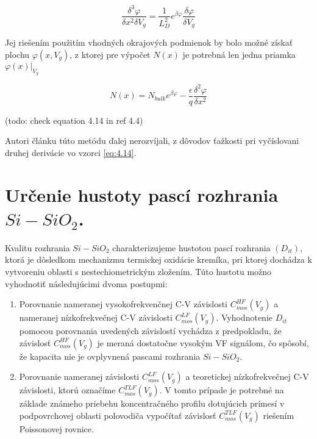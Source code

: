 \begin{equation}\label{eq:4.13}
\frac{\delta^{3}\varphi}{\delta x^{2} \delta V_{g}} = \frac{1}{L_{D}^{2}} e^{\beta\varphi} \frac{\delta\varphi}{\delta V_{g}}
\end{equation}

Jej riešením použitím vhodných okrajových podmienok by bolo možné
získať plochu $\varphi(x,V_{g})$, z ktorej pre výpočet $N(x)$ je
potrebná len jedna priamka $\varphi(x)\rvert_{V_{g}}$

\begin{equation}\label{eq:4.14}
N(x) = N_{bulk}e^{\beta\varphi} - \frac{\epsilon}{q} \frac{\delta^{2}\varphi}{\delta x^{2}}
\end{equation}

(todo: check equation 4.14 in ref 4.4)

Autori článku \cite{4.4} túto metódu ďalej nerozvíjali, z dôvodov
ťažkosti pri vyčíslovani druhej derivácie vo vzorci \ref{eq:4.14}.


\section{Určenie hustoty pascí rozhrania $Si-SiO_{2}$.}\label{sec:4.2}

Kvalitu rozhrania $Si-SiO_{2}$ charakterizujeme hustotou pascí
rozhrania $(D_{it})$, ktorá je dôsledkom mechanizmu termickej oxidácie
kremíka, pri ktorej dochádza k vytvoreniu oblasti s nestechiometrickým
zložením. Túto hustotu možno vyhodnotiť následujúcimi dvoma postupmi:

\begin{enumerate}
\item Porovnanie nameranej vysokofrekvenčnej C-V závislosti
  $C_{mos}^{HF}(V_{g})$ a nameranej nízkofrekvečnej C-V závislosti
  $C_{mos}^{LF}(V_{g})$. Vyhodnotenie $D_{it}$ pomocou porovnania
  uvedených závislostí vychádza z predpokladu, že závislosť
  $C_{mos}^{HF}(V_{g})$ je meraná dostatočne vysokým VF signálom, čo
  spôsobí, že kapacita nie je ovplyvnená pascami rozhrania
  $Si-SiO_{2}$.
\item Porovnanie nameranej závislosti $C_{mos}^{LF}(V_{g})$ a
  teoretickej nízkofrekvečnej C-V závislosti, ktorú označíme
  $C_{mos}^{TLF}(V_{g})$.  V tomto prípade je potrebné na základe
  známeho priebehu koncentračného profilu dotujúcich prímesí v
  podpovrchovej oblasti polovodiča vypočítať závislosť
  $C_{mos}^{TLF}(V_{g})$ riešením Poissonovej rovnice.
\end{enumerate}


